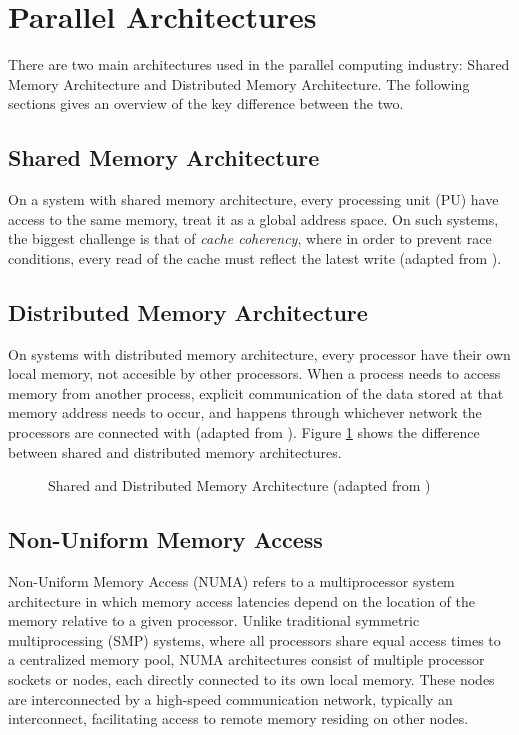 \section{Parallel Architectures}
There are two main architectures used in the parallel computing industry: Shared Memory Architecture and Distributed Memory Architecture. The following sections gives an overview of the key difference between the two.

\subsection{Shared Memory Architecture}
On a system with shared memory architecture, every processing unit (PU) have access to the same memory, treat it as a global address space. On such systems, the biggest challenge is that of \textit{cache coherency}, where in order to prevent race conditions, every read of the cache must reflect the latest write (adapted from \cite{manchanda2010non}). 

\subsection{Distributed Memory Architecture}
On systems with distributed memory architecture, every processor have their own local memory, not accesible by other processors. When a process needs to access memory from another process, explicit communication of the data stored at that memory address needs to occur, and happens through whichever network the processors are connected with (adapted from \cite{manchanda2010non}). Figure \ref{fig:sharedmemory} shows the difference between shared and distributed memory architectures.
\medskip


\begin{figure}[ht]
    \centering
    \caption{Shared and Distributed Memory Architecture (adapted from \cite{llnlparallel})}
    \label{fig:sharedmemory}
\end{figure}

\subsection{Non-Uniform Memory Access}
Non-Uniform Memory Access (NUMA) refers to a multiprocessor system architecture in which memory access latencies depend on the location of the memory relative to a given processor. Unlike traditional symmetric multiprocessing (SMP) systems, where all processors share equal access times to a centralized memory pool, NUMA architectures consist of multiple processor sockets or nodes, each directly connected to its own local memory. These nodes are interconnected by a high-speed communication network, typically an interconnect, facilitating access to remote memory residing on other nodes.

